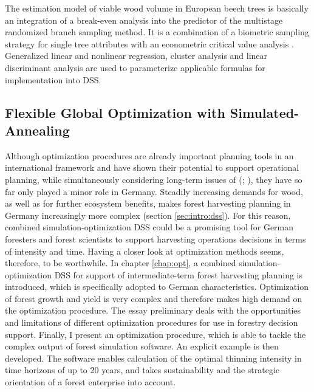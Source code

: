 The estimation model of viable wood volume in European beech trees is basically an integration of a break-even analysis into the predictor of the multistage randomized branch sampling method. It is a combination of a biometric sampling strategy for single tree attributes \citep[p. 405]{Gregoire_2008} with an econometric critical value analysis \citep[p. 46]{mushoff_2013}. Generalized linear and nonlinear regression, cluster analysis and linear discriminant analysis are used to parameterize applicable formulas for implementation into DSS.

\subsection{Flexible Global Optimization with Simulated-Annealing}
\label{subsec:intro:struct:opt}
Although optimization procedures are already important planning tools in an international framework \citep[p. 1]{hoganson_2015} and have shown their potential to support operational planning, while simultaneously considering long-term issues of (\citealp[p. 1]{hoganson_2015}; \citealp[p. 1081]{pretzsch_2008}), they have so far only played a minor role in Germany. Steadily increasing demands for wood, as well as for further ecosystem benefits, makes forest harvesting planning in Germany increasingly more complex (section \ref{sec:intro:dss}). For this reason, combined simulation-optimization DSS could be a promising tool for German foresters and forest scientists to support harvesting operations decisions in terms of intensity and time. Having a closer look at optimization methods seems, therefore, to be worthwhile. In chapter \ref{chap:opt}, a combined simulation-optimization DSS for support of intermediate-term forest harvesting planning is introduced, which is specifically adopted to German characteristics. Optimization of forest growth and yield is very complex and therefore makes high demand on the optimization procedure. The essay preliminary deals with the opportunities and limitations of different optimization procedures for use in forestry decision support. Finally, I present an optimization procedure, which is able to tackle the complex output of forest simulation software. An explicit example is then developed. The software enables calculation of the optimal thinning intensity in time horizons of up to 20 years, and takes sustainability and the strategic orientation of a forest enterprise into account.

